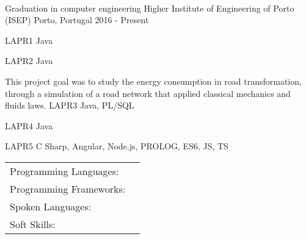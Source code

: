 \documentclass[]{awesome-cv}
\begin{document}
\begin{center}
	  \\
	
\end{center}

\vspace{-2mm}
\begin{cventries}
	\cventry
	{Graduation in computer engineering}
	{Higher Institute of Engineering of Porto (ISEP)}
	{Porto, Portugal}
	{2016 - Present}
	{}
\end{cventries}

\vspace{-5mm}
\begin{cventries}
 	\cventry
	{}
	{LAPR1}
	{Java}
	{}
	{}
	
	\vspace{-5mm}
	\cventry
	{}
	{LAPR2}
	{Java}
	{}
	{}
	
	\vspace{-5mm}
	\cventry
	{This project goal was to study the energy consumption in road
	transformation, through a simulation of a road network that
	applied classical mechanics and fluids laws.}
	{LAPR3}
	{Java, PL/SQL}
	{}
	{}
	
	\vspace{-5mm}
	\cventry
	{}
	{LAPR4}
	{Java}
	{}
	{}

	\vspace{-5mm}
	\cventry
	{}
	{LAPR5}
	{C Sharp, Angular, Node.js, PROLOG, ES6, JS, TS}
	{}
	{}
	
	\vspace{-5mm}
\end{cventries}

\vspace{-2mm}
\begin{cventries}
	\vspace{-2mm}
	\cventry
	{}
	{\def\arraystretch{1.15}{\begin{tabular}{ l l }
		Programming Languages:  & {\skill{ Java, JavaScript, C Sharp, PROLOG }} \\
		Programming Frameworks:  & {\skill{ Angular, Node.js, .NET Core, Jira, Git, SonarQube, Jenkins, Oracle, Maven}} \\
		Spoken Languages:  & {\skill{ English, Portuguese, French, Spanish}} \\
		Soft Skills:  & {\skill{ Team work, Self-motivation, Creativity, Good communication}} \\
		\end{tabular}}}
	{}
	{}
	{}
\end{cventries}

\
\end{document}
